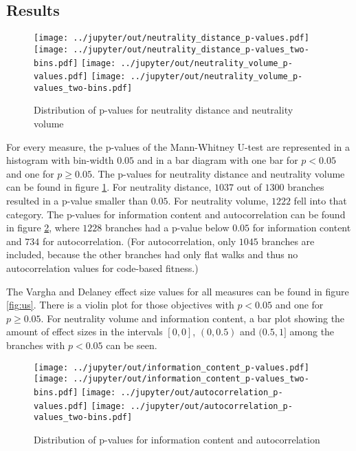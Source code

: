 \subsection{Results}

\begin{figure}[h]
	\texttt{[image: ../jupyter/out/neutrality\_distance\_p-values.pdf]}
	\texttt{[image: ../jupyter/out/neutrality\_distance\_p-values\_two-bins.pdf]}
	\texttt{[image: ../jupyter/out/neutrality\_volume\_p-values.pdf]}
	\texttt{[image: ../jupyter/out/neutrality\_volume\_p-values\_two-bins.pdf]}
	\caption{Distribution of p-values for neutrality distance and neutrality volume}\label{fig:pNeutral}
\end{figure}

For every measure, the p-values of the Mann-Whitney U-test are represented in a histogram with bin-width $0.05$ and in a bar diagram with one bar for $p < 0.05$ and one for $p \geq 0.05$.
The p-values for neutrality distance and neutrality volume can be found in figure \ref{fig:pNeutral}.
For neutrality distance, $1037$ out of $1300$ branches resulted in a p-value smaller than $0.05$.
For neutrality volume, $1222$ fell into that category.
The p-values for information content and autocorrelation can be found in figure \ref{fig:bug}, where $1228$ branches had a p-value below $0.05$ for information content and $734$ for autocorrelation. (For autocorrelation, only $1045$ branches are included, because the other branches had only flat walks and thus no autocorrelation values for code-based fitness.)

The Vargha and Delaney effect size values for all measures can be found in figure \ref{fig:us}.
There is a violin plot for those objectives with $p < 0.05$ and one for $p \geq 0.05$.
For neutrality volume and information content, a bar plot showing the amount of effect sizes in the intervals $[0, 0]$, $(0, 0.5)$ and $(0.5, 1]$ among the branches with $p < 0.05$ can be seen.

\begin{figure}[h]
	\texttt{[image: ../jupyter/out/information\_content\_p-values.pdf]}
	\texttt{[image: ../jupyter/out/information\_content\_p-values\_two-bins.pdf]}
	\texttt{[image: ../jupyter/out/autocorrelation\_p-values.pdf]}
	\texttt{[image: ../jupyter/out/autocorrelation\_p-values\_two-bins.pdf]}
	\caption{Distribution of p-values for information content and autocorrelation}\label{fig:bug}
\end{figure}

